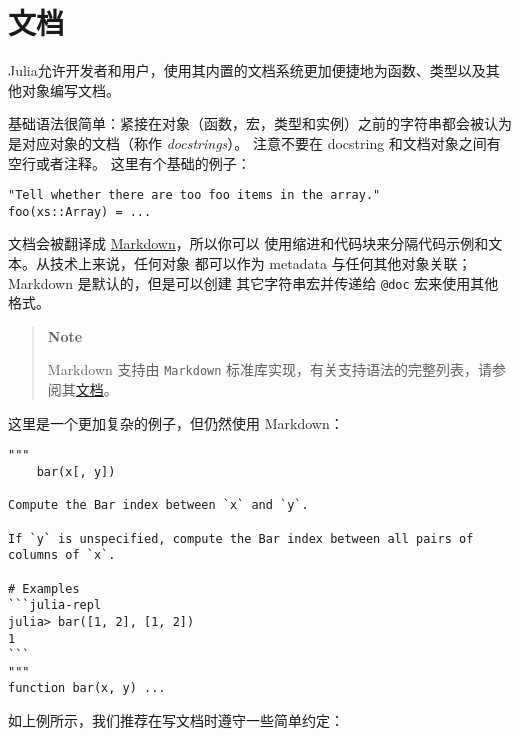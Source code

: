 \hypertarget{17356560956725341158}{}


\chapter{文档}



Julia允许开发者和用户，使用其内置的文档系统更加便捷地为函数、类型以及其他对象编写文档。  



基础语法很简单：紧接在对象（函数，宏，类型和实例）之前的字符串都会被认为是对应对象的文档（称作 \emph{docstrings}）。 注意不要在 docstring 和文档对象之间有空行或者注释。 这里有个基础的例子：




\begin{verbatim}
"Tell whether there are too foo items in the array."
foo(xs::Array) = ...
\end{verbatim}



文档会被翻译成 \href{https://en.wikipedia.org/wiki/Markdown}{Markdown}，所以你可以 使用缩进和代码块来分隔代码示例和文本。从技术上来说，任何对象 都可以作为 metadata 与任何其他对象关联；Markdown 是默认的，但是可以创建 其它字符串宏并传递给 \texttt{@doc} 宏来使用其他格式。



\begin{quote}
\textbf{Note}

Markdown 支持由 \texttt{Markdown} 标准库实现，有关支持语法的完整列表，请参阅其\hyperlink{4003493111480691691}{文档}。

\end{quote}


这里是一个更加复杂的例子，但仍然使用 Markdown：




\begin{verbatim}
"""
    bar(x[, y])

Compute the Bar index between `x` and `y`.

If `y` is unspecified, compute the Bar index between all pairs of columns of `x`.

# Examples
```julia-repl
julia> bar([1, 2], [1, 2])
1
```
"""
function bar(x, y) ...
\end{verbatim}



如上例所示，我们推荐在写文档时遵守一些简单约定：



